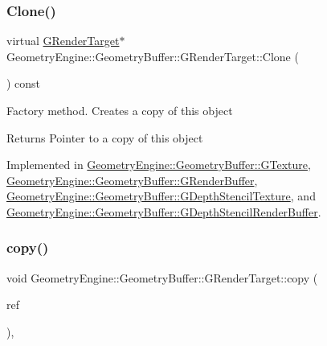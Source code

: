 \subsubsection{\texorpdfstring{Clone()}{Clone()}}
{\footnotesize\ttfamily virtual \mbox{\hyperlink{class_geometry_engine_1_1_geometry_buffer_1_1_g_render_target}{G\+Render\+Target}}$\ast$ Geometry\+Engine\+::\+Geometry\+Buffer\+::\+G\+Render\+Target\+::\+Clone (\begin{DoxyParamCaption}{ }\end{DoxyParamCaption}) const\hspace{0.3cm}{\ttfamily [pure virtual]}}

Factory method. Creates a copy of this object \begin{DoxyReturn}{Returns}
Pointer to a copy of this object 
\end{DoxyReturn}


Implemented in \mbox{\hyperlink{class_geometry_engine_1_1_geometry_buffer_1_1_g_texture_ad8a2b027a88527a03b925448d98efcbf}{Geometry\+Engine\+::\+Geometry\+Buffer\+::\+G\+Texture}}, \mbox{\hyperlink{class_geometry_engine_1_1_geometry_buffer_1_1_g_render_buffer_a451303386c519d70d50875873dc7b1fc}{Geometry\+Engine\+::\+Geometry\+Buffer\+::\+G\+Render\+Buffer}}, \mbox{\hyperlink{class_geometry_engine_1_1_geometry_buffer_1_1_g_depth_stencil_texture_ae831cf8a8610c82ae4b50622348b4e57}{Geometry\+Engine\+::\+Geometry\+Buffer\+::\+G\+Depth\+Stencil\+Texture}}, and \mbox{\hyperlink{class_geometry_engine_1_1_geometry_buffer_1_1_g_depth_stencil_render_buffer_a5c64d816141633964dd33605fbf42f97}{Geometry\+Engine\+::\+Geometry\+Buffer\+::\+G\+Depth\+Stencil\+Render\+Buffer}}.

\mbox{\label{class_geometry_engine_1_1_geometry_buffer_1_1_g_render_target_a84368b4a4cac9f916d36c3117e6b1224}} 
\subsubsection{\texorpdfstring{copy()}{copy()}}
{\footnotesize\ttfamily void Geometry\+Engine\+::\+Geometry\+Buffer\+::\+G\+Render\+Target\+::copy (\begin{DoxyParamCaption}\item[{const \mbox{\hyperlink{class_geometry_engine_1_1_geometry_buffer_1_1_g_render_target}{G\+Render\+Target}} \&}]{ref }\end{DoxyParamCaption})\hspace{0.3cm}{\ttfamily [protected]}, {\ttfamily [virtual]}}

